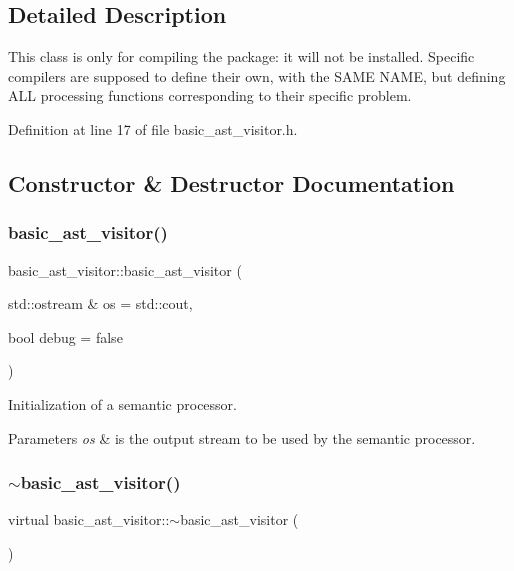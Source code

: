 \subsection{Detailed Description}
This class is only for compiling the package\+: it will not be installed. Specific compilers are supposed to define their own, with the S\+A\+ME N\+A\+ME, but defining A\+LL processing functions corresponding to their specific problem. 

Definition at line 17 of file basic\+\_\+ast\+\_\+visitor.\+h.



\subsection{Constructor \& Destructor Documentation}
\mbox{\label{classbasic__ast__visitor_a194d2f7cced321e384b68782d8e33a47}} 
\subsubsection{basic\+\_\+ast\+\_\+visitor()}
{\footnotesize\ttfamily basic\+\_\+ast\+\_\+visitor\+::basic\+\_\+ast\+\_\+visitor (\begin{DoxyParamCaption}\item[{std\+::ostream \&}]{os = {\ttfamily std\+:\+:cout},  }\item[{bool}]{debug = {\ttfamily false} }\end{DoxyParamCaption})\hspace{0.3cm}{\ttfamily [protected]}}

Initialization of a semantic processor.


\begin{DoxyParams}{Parameters}
{\em os} & is the output stream to be used by the semantic processor. \\
\hline
\end{DoxyParams}
\mbox{\label{classbasic__ast__visitor_a110508f9dd86fc1472ffee3d2b3bd0f5}} 
\subsubsection{$\sim$basic\+\_\+ast\+\_\+visitor()}
{\footnotesize\ttfamily virtual basic\+\_\+ast\+\_\+visitor\+::$\sim$basic\+\_\+ast\+\_\+visitor (\begin{DoxyParamCaption}{ }\end{DoxyParamCaption})\hspace{0.3cm}{\ttfamily [virtual]}}

